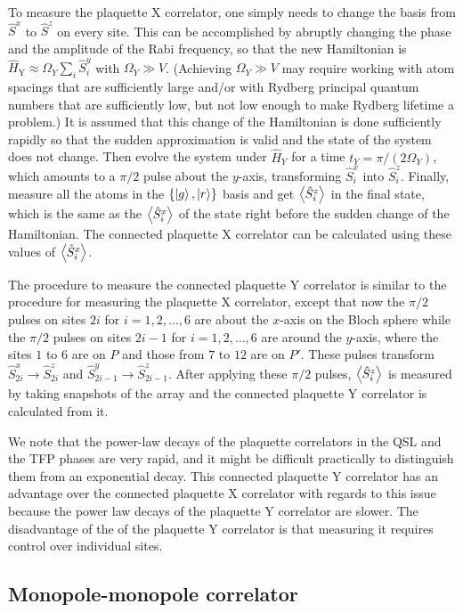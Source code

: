 \documentclass[twocolumn,superscriptaddress,amsmath,amssymb,aps,prx,nofootinbib]{revtex4-2}
\begin{document}
To measure the plaquette X correlator, one simply needs to change the basis from $\hat{S}^x$ to $\hat{S}^z$ on every site.
This can be accomplished by abruptly changing the phase and the amplitude of the Rabi frequency, so that the new Hamiltonian is $\hat{H}_\text{Y} \approx \Omega_Y \sum_i \hat{S}^y_i$ with $\Omega_Y \gg V$. 
(Achieving $\Omega_Y \gg V$ may require working with atom spacings that are sufficiently large and/or with Rydberg principal quantum numbers that are sufficiently low, but not low enough to make Rydberg lifetime a problem.) 
It is assumed that this change of the Hamiltonian is done sufficiently rapidly so that the sudden approximation is valid and the state of the system does not change.
Then evolve the system under $\hat{H}_Y$ for a time  $t_Y = \pi/(2 \Omega_Y)$, which amounts to a $\pi/2$ pulse about the $y$-axis,  transforming $\hat{S}^x_i$ into $\hat{S}^z_i$. 
Finally, measure all the atoms in the $\{\ket{g},\ket{r}\}$ basis and get $\expval{ \hat{S}^z_i}$ in the final state, which is the same as the $\expval{ \hat{S}^x_i}$ of the state right before the sudden change of the Hamiltonian.
The connected plaquette X correlator can be calculated using these values of $\expval{\hat{S}_i^x}$.

The procedure to measure the connected plaquette Y correlator is similar to the procedure for measuring the plaquette X correlator, except that now the $\pi/2$ pulses on sites  $2i$ for $i= 1,2,\ldots,6$ are about the $x$-axis on the Bloch sphere while the $\pi/2$ pulses on  sites $2i-1$ for $i=1,2,\ldots,6$ are around the $y$-axis, where the sites $1$ to $6$ are on $P$ and those from $7$ to $12$ are on $P'$. 
These pulses transform $\hat{S}_{2i}^{x} \rightarrow \hat{S}^{z}_{2i}$ and $\hat{S}_{2i-1}^{y} \rightarrow \hat{S}^{z}_{2i-1}$.
After applying these $\pi/2$ pulses, $\expval{ \hat{S}_i^z}$ is measured by taking snapshots of the array and the connected plaquette Y correlator is calculated from it.

We note that the power-law decays of the plaquette correlators in the QSL and the TFP phases are very rapid, and it might be difficult practically to distinguish them from an exponential decay.
This connected plaquette Y correlator has an advantage over the connected plaquette X correlator with regards to this issue because the power law decays of the plaquette Y correlator are slower. The disadvantage of the of the plaquette Y correlator is that measuring it requires control over individual sites.

\subsection{Monopole-monopole correlator}\label{sec:monopole}
\end{document}
